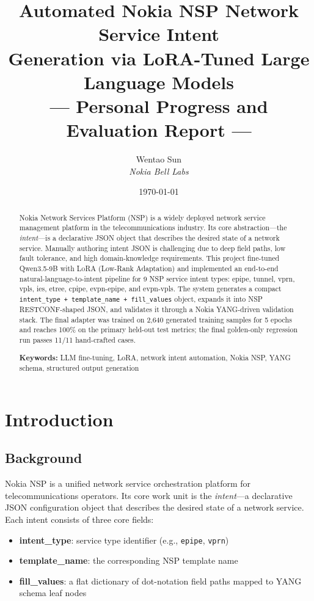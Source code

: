 \documentclass[12pt, a4paper]{article}
\title{%
  \vspace{-1cm}
  {\LARGE\bfseries Automated Nokia NSP Network Service Intent\\[4pt]
  Generation via LoRA-Tuned Large Language Models}\\[12pt]
  {\large --- Personal Progress and Evaluation Report ---}
}
\author{%
  Wentao Sun \\[3pt]
  {\small\textit{Nokia Bell Labs}}
}
\date{\today}
\newcommand{\intenttype}[1]{\texttt{#1}}
\newcommand{\yang}{\textsc{YANG}}
\newcommand{\nsp}{\textsc{NSP}}
\newcommand{\lora}{\textsc{LoRA}}
\begin{document}
\maketitle
\thispagestyle{empty}

\begin{abstract}
\noindent
Nokia Network Services Platform (\nsp{}) is a widely deployed network service management platform in the telecommunications industry. Its core abstraction---the \emph{intent}---is a declarative JSON object that describes the desired state of a network service. Manually authoring intent JSON is challenging due to deep field paths, low fault tolerance, and high domain-knowledge requirements. This project fine-tuned Qwen3.5-9B with \lora{} (Low-Rank Adaptation) and implemented an end-to-end natural-language-to-intent pipeline for 9 NSP service intent types: epipe, tunnel, vprn, vpls, ies, etree, cpipe, evpn-epipe, and evpn-vpls. The system generates a compact \texttt{intent\_type + template\_name + fill\_values} object, expands it into NSP RESTCONF-shaped JSON, and validates it through a Nokia \yang{}-driven validation stack. The final adapter was trained on 2,640 generated training samples for 5 epochs and reaches 100\% on the primary held-out test metrics; the final golden-only regression run passes 11/11 hand-crafted cases.

\vspace{6pt}
\noindent\textbf{Keywords:} LLM fine-tuning, LoRA, network intent automation, Nokia NSP, YANG schema, structured output generation
\end{abstract}

\newpage
\tableofcontents
\newpage

\section{Introduction}

\subsection{Background}

Nokia \nsp{} is a unified network service orchestration platform for telecommunications operators. Its core work unit is the \emph{intent}---a declarative JSON configuration object that describes the desired state of a network service. Each intent consists of three core fields:

\begin{itemize}
  \item \textbf{intent\_type}: service type identifier (e.g., \intenttype{epipe}, \intenttype{vprn})
  \item \textbf{template\_name}: the corresponding \nsp{} template name
  \item \textbf{fill\_values}: a flat dictionary of dot-notation field paths mapped to \yang{} schema leaf nodes
\end{itemize}
\end{document}

